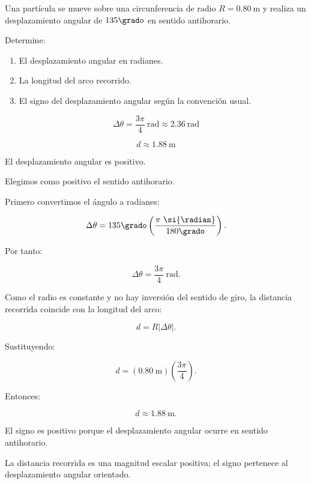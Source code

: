 ﻿\nivelbasico

\begin{ejercicio}
Una partícula se mueve sobre una circunferencia de radio
\(R=\SI{0.80}{\meter}\) y realiza un desplazamiento angular de
\(135\grado\) en sentido antihorario.

Determine:

\begin{enumerate}[label=\alph*)]
    \item El desplazamiento angular en radianes.
    \item La longitud del arco recorrido.
    \item El signo del desplazamiento angular según la convención usual.
\end{enumerate}
\end{ejercicio}

\begin{respuesta}
\[
\boxed{\Delta\theta=\frac{3\pi}{4}\ \si{\radian}
\approx\SI{2.36}{\radian}}
\]

\[
\boxed{d\approx\SI{1.88}{\meter}}
\]

El desplazamiento angular es positivo.
\end{respuesta}

\begin{explicacion}
Elegimos como positivo el sentido antihorario.

Primero convertimos el ángulo a radianes:

\[
\Delta\theta
=
135\grado
\left(\frac{\pi\ \si{\radian}}{180\grado}\right).
\]

Por tanto:

\[
\boxed{\Delta\theta=\frac{3\pi}{4}\ \si{\radian}}.
\]

Como el radio es constante y no hay inversión del sentido de giro,
la distancia recorrida coincide con la longitud del arco:

\[
d=R|\Delta\theta|.
\]

Sustituyendo:

\[
d
=
(\SI{0.80}{\meter})
\left(\frac{3\pi}{4}\right).
\]

Entonces:

\[
\boxed{d\approx\SI{1.88}{\meter}}.
\]

El signo es positivo porque el desplazamiento angular ocurre en
sentido antihorario.

La distancia recorrida es una magnitud escalar positiva; el signo
pertenece al desplazamiento angular orientado.
\end{explicacion}


